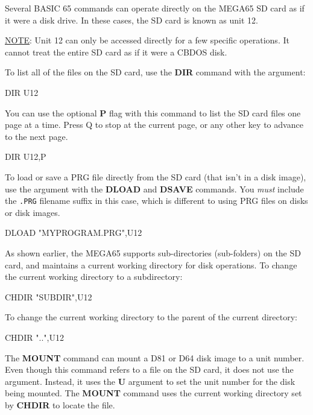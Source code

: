 Several BASIC 65 commands can operate directly on the MEGA65 SD card as if it were a disk drive. In these cases, the SD card is known as unit 12.

\underline{NOTE}: Unit 12 can only be accessed directly for a few specific operations. It cannot treat the entire SD card as if it were a CBDOS disk.

To list all of the files on the SD card, use the {\bf DIR} command with the  argument:

\begin{screencode}
DIR U12
\end{screencode}

You can use the optional {\bf P} flag with this command to list the SD card files one page at a time. Press Q to stop at the current page, or any other key to advance to the next page.

\begin{screencode}
DIR U12,P
\end{screencode}

To load or save a PRG file directly from the SD card (that isn't in a disk image), use the  argument with the {\bf DLOAD} and {\bf DSAVE} commands. You {\em must} include the {\tt .PRG} filename suffix in this case, which is different to using PRG files on disks or disk images.

\begin{screencode}
DLOAD "MYPROGRAM.PRG",U12
\end{screencode}

As shown earlier, the MEGA65 supports sub-directories (sub-folders) on the SD card, and maintains a current working directory for disk operations. To change the current working directory to a subdirectory:

\begin{screencode}
CHDIR "SUBDIR",U12
\end{screencode}

To change the current working directory to the parent of the current directory:

\begin{screencode}
CHDIR "..",U12
\end{screencode}

The {\bf MOUNT} command can mount a D81 or D64 disk image to a unit number. Even though this command refers to a file on the SD card, it does not use the  argument. Instead, it uses the {\bf U} argument to set the unit number for the disk being mounted. The {\bf MOUNT} command uses the current working directory set by {\bf CHDIR} to locate the file.


